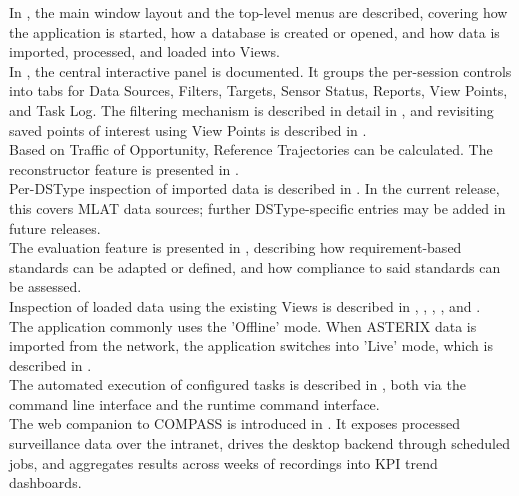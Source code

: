 In , the main window layout and the top-level menus are described, covering how the application is started, how a database is created or opened, and how data is imported, processed, and loaded into Views. \\

In , the central interactive panel is documented. It groups the per-session controls into tabs for Data Sources, Filters, Targets, Sensor Status, Reports, View Points, and Task Log. The filtering mechanism is described in detail in , and revisiting saved points of interest using View Points is described in . \\

Based on Traffic of Opportunity, Reference Trajectories can be calculated. The reconstructor feature is presented in . \\

Per-DSType inspection of imported data is described in . In the current release, this covers MLAT data sources; further DSType-specific entries may be added in future releases. \\

The evaluation feature is presented in , describing how requirement-based standards can be adapted or defined, and how compliance to said standards can be assessed. \\

Inspection of loaded data using the existing Views is described in , , , , and . \\

The application commonly uses the 'Offline' mode. When ASTERIX data is imported from the network, the application switches into 'Live' mode, which is described in . \\

The automated execution of configured tasks is described in , both via the command line interface and the runtime command interface. \\

The web companion to COMPASS is introduced in . It exposes processed surveillance data over the intranet, drives the desktop backend through scheduled jobs, and aggregates results across weeks of recordings into KPI trend dashboards. \\

